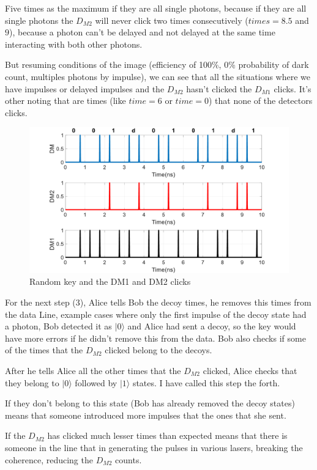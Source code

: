 \begin{refsection}
Five times as the maximum if they are all single photons, because if they are all single photons the $D_{M2}$ will never click two times consecutively ($times=8.5$ and $9$), because a photon can't be delayed and not delayed at the same time interacting with both other photons.

But resuming conditions of the image (efficiency of 100\%, 0\% probability of dark count, multiples photons by impulse), we can see that all the situations where we have impulses or delayed impulses and the $D_{M2}$ hasn't clicked the $D_{M1}$ clicks. It's other noting that are times (like $time=6$ or $time=0$) that none of the detectors clicks.

\begin{figure}[hbt!]
\centering
\includegraphics[width=1\textwidth]{./sdf/tq_76558_cow_protocol/slides/figures/DM3.pdf}
\caption{Random key and the DM1 and DM2 clicks}
\label{fig:dm3}
\end{figure}

For the next step (3), Alice tells Bob the decoy times, he removes this times from the data Line, example cases where only the first impulse of the decoy state had a photon, Bob detected it as $|0\rangle$ and Alice had sent a decoy, so the key would have more errors if he didn't remove this from the data. Bob also checks if some of the times that the $D_{M2}$ clicked belong to the decoys.

After he tells Alice all the other times that the $D_{M2}$ clicked, Alice checks that they belong to $|0\rangle$ followed by $|1\rangle$ states. I have called this step the forth.

If they don't belong to this state (Bob has already removed the decoy states) means that someone introduced more impulses that the ones that she sent.

If the $D_{M2}$ has clicked much lesser times than expected means that there is someone in the line that in generating the pulses in various lasers, breaking the coherence, reducing the $D_{M2}$ counts.


\end{refsection}

